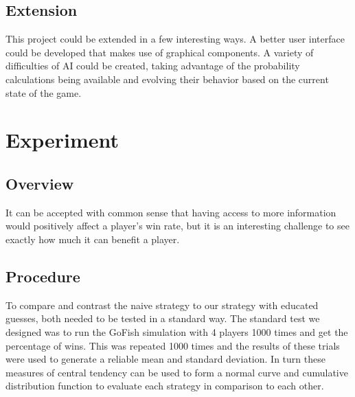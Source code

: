 \documentclass[preprint,12pt]{elsarticle}
\begin{document}
\subsection{Extension} 
This project could be extended in a few interesting ways. A better user interface could be developed that makes use of graphical components. A variety of difficulties of AI could be created, taking advantage of the probability calculations being available and evolving their behavior based on the current state of the game.

\section{Experiment}
\label{S:2}
\subsection{Overview}
It can be accepted with common sense that having access to more information would positively affect a player's win rate, but it is an interesting challenge to see exactly how much it can benefit a player.

\subsection{Procedure}
To compare and contrast the naive strategy to our strategy with educated guesses, both needed to be tested in a standard way. The standard test we designed was to run the GoFish simulation with 4 players 1000 times and get the percentage of wins. This was repeated 1000 times and the results of these trials were used to generate a reliable mean and standard deviation. In turn these measures of central tendency can be used to form a normal curve and cumulative distribution function to evaluate each strategy in comparison to each other.
\end{document}
